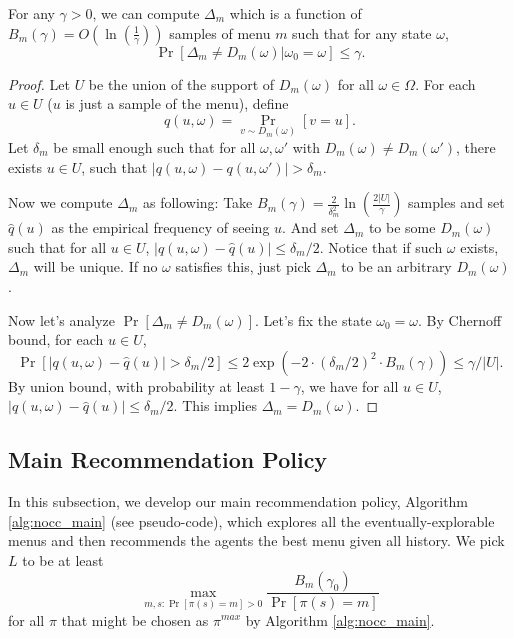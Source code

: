 \begin{lemma}
\label{lem:deltam}
For any $\gamma > 0$, we can compute $\Delta_m$ which is a function of $B_m(\gamma) = O\left(\ln\left(\frac{1}{\gamma}\right)\right)$ samples of menu $m$ such that for any state $\omega$,
\[
\Pr[\Delta_m \neq D_m(\omega) | \omega_0 = \omega] \leq \gamma.
\]
\end{lemma}

\begin{proof}
Let $U$ be the union of the support of $D_m(\omega)$ for all $\omega \in \varOmega$. For each $u \in U$ ($u$ is just a sample of the menu), define
    \[ q(u,\omega) = \Pr_{v \sim D_m(\omega)}[v = u].\]
Let $\delta_m$ be small enough such that for all $\omega, \omega'$ with $D_m(\omega) \neq D_m(\omega')$, there exists $u \in U$, such that $|q(u,\omega) - q(u,\omega')| > \delta_m$.

Now we compute $\Delta_m$ as following: Take $B_m(\gamma) = \frac{2}{\delta_m^2}\ln\left(\frac{2|U|}{\gamma}\right) $ samples and set $\hat{q}(u)$ as the empirical frequency of seeing $u$. And set $\Delta_m$ to be some $D_m(\omega)$ such that for all $u \in U$, $|q(u,\omega) - \hat{q}(u)| \leq \delta_m / 2$. Notice that if such $\omega$ exists, $\Delta_m$ will be unique. If no $\omega$ satisfies this, just pick $\Delta_m$ to be an arbitrary $D_m(\omega)$.

Now let's analyze $\Pr[\Delta_m \neq D_m(\omega)]$. Let's fix the state $\omega_0 = \omega$. By Chernoff bound, for each $u \in U$,
\[
\Pr[|q(u,\omega) -\hat{q}(u)| > \delta_m/2] \leq 2\exp\left(-2 \cdot
    (\delta_m/2)^2
    \cdot B_m(\gamma)\right) \leq \gamma/|U|.
\]
By union bound, with probability at least $1-\gamma$, we have for all $u \in U$, $|q(u,\omega) - \hat{q}(u)| \leq \delta_m / 2$. This implies $\Delta_m = D_m(\omega)$.
\end{proof}

\subsection{Main Recommendation Policy}
\label{sec:private_main}
In this subsection, we develop our main recommendation policy, Algorithm \ref{alg:nocc_main} (see pseudo-code), which explores all the eventually-explorable menus and then recommends the agents the best menu given all history. We pick $L$ to be at least
\[ \max_{m,s:\Pr[\pi(s)=m] >0} \frac{B_m(\gamma_0)}{ \Pr[\pi(s)=m]}\]
for all $\pi$ that might be chosen as $\pi^{max}$ by Algorithm \ref{alg:nocc_main}.

